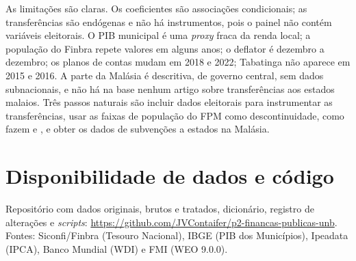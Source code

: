 \documentclass[10pt,twocolumn]{article}
\begin{document}
As limitações são claras. Os coeficientes são associações condicionais; as transferências são endógenas e não há instrumentos, pois o painel não contém variáveis eleitorais. O PIB municipal é uma \textit{proxy} fraca da renda local; a população do Finbra repete valores em alguns anos; o deflator é dezembro a dezembro; os planos de contas mudam em 2018 e 2022; Tabatinga não aparece em 2015 e 2016. A parte da Malásia é descritiva, de governo central, sem dados subnacionais, e não há na base nenhum artigo sobre transferências aos estados malaios. Três passos naturais são incluir dados eleitorais para instrumentar as transferências, usar as faixas de população do FPM como descontinuidade, como fazem \citet{alves2024} e \citet{castro2021}, e obter os dados de subvenções a estados na Malásia.

\section*{Disponibilidade de dados e código}
Repositório com dados originais, brutos e tratados, dicionário, registro de alterações e \textit{scripts}: \url{https://github.com/JVContaifer/p2-financas-publicas-unb}. Fontes: Siconfi/Finbra (Tesouro Nacional), IBGE (PIB dos Municípios), Ipeadata (IPCA), Banco Mundial (WDI) e FMI (WEO 9.0.0).

\small


\end{document}
